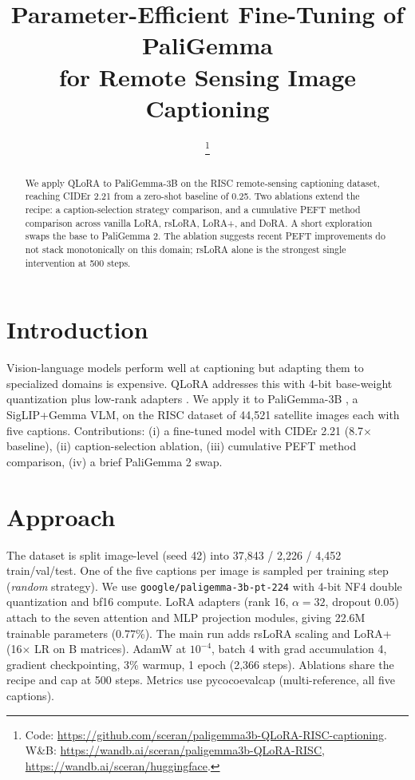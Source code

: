 \documentclass[conference]{IEEEtran}
\begin{document}
\title{Parameter-Efficient Fine-Tuning of PaliGemma\\for Remote Sensing Image Captioning}

\author{
\thanks{Code: \url{https://github.com/sceran/paligemma3b-QLoRA-RISC-captioning}. W\&B: \url{https://wandb.ai/sceran/paligemma3b-QLoRA-RISC}, \url{https://wandb.ai/sceran/huggingface}.}}

\maketitle

\begin{abstract}
We apply QLoRA to PaliGemma-3B on the RISC remote-sensing captioning dataset, reaching CIDEr 2.21 from a zero-shot baseline of 0.25. Two ablations extend the recipe: a caption-selection strategy comparison, and a cumulative PEFT method comparison across vanilla LoRA, rsLoRA, LoRA+, and DoRA. A short exploration swaps the base to PaliGemma 2. The ablation suggests recent PEFT improvements do not stack monotonically on this domain; rsLoRA alone is the strongest single intervention at 500 steps.
\end{abstract}

\section{Introduction}

Vision-language models perform well at captioning but adapting them to specialized domains is expensive. QLoRA \cite{dettmers2023qlora} addresses this with 4-bit base-weight quantization plus low-rank adapters \cite{hu2022lora}. We apply it to PaliGemma-3B \cite{beyer2024paligemma}, a SigLIP+Gemma VLM, on the RISC dataset of 44{,}521 satellite images each with five captions. Contributions: (i) a fine-tuned model with CIDEr 2.21 (8.7$\times$ baseline), (ii) caption-selection ablation, (iii) cumulative PEFT method comparison, (iv) a brief PaliGemma 2 swap.

\section{Approach}

The dataset is split image-level (seed 42) into 37{,}843 / 2{,}226 / 4{,}452 train/val/test. One of the five captions per image is sampled per training step (\emph{random} strategy). We use \texttt{google/paligemma-3b-pt-224} with 4-bit NF4 double quantization and bf16 compute. LoRA adapters (rank 16, $\alpha{=}32$, dropout 0.05) attach to the seven attention and MLP projection modules, giving 22.6M trainable parameters (0.77\%). The main run adds rsLoRA scaling \cite{kalajdzievski2023rslora} and LoRA+ \cite{hayou2024loraplus} (16$\times$ LR on B matrices). AdamW at $10^{-4}$, batch 4 with grad accumulation 4, gradient checkpointing, 3\% warmup, 1 epoch (2{,}366 steps). Ablations share the recipe and cap at 500 steps. Metrics use pycocoevalcap (multi-reference, all five captions).
\end{document}
